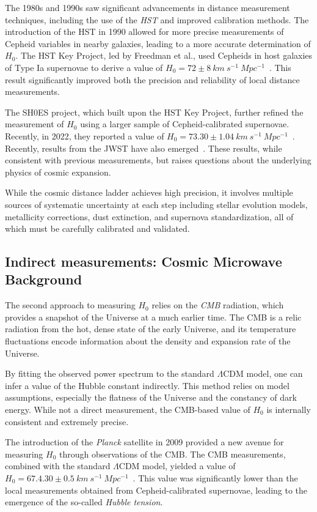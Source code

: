 The 1980s and 1990s saw significant advancements in distance measurement techniques, including the use of the \textit{\ac{HST}} and improved calibration methods. The introduction of the \ac{HST} in 1990 allowed for more precise measurements of Cepheid variables in nearby galaxies, leading to a more accurate determination of $H_0$. The \ac{HST} Key Project, led by Freedman et al., used Cepheids in host galaxies of Type Ia supernovae to derive a value of $H_0 = 72 \pm 8~km~s^{-1}~Mpc^{-1}$~\citep{freedman2001final}. This result significantly improved both the precision and reliability of local distance measurements.

The \ac{SH0ES} project, which built upon the \ac{HST} Key Project, further refined the measurement of $H_0$ using a larger sample of Cepheid-calibrated supernovae. Recently, in 2022, they reported a value of $H_0 = 73.30 \pm 1.04~km~s^{-1}~Mpc^{-1}$~\citep{riess2022comprehensive}. Recently, results from the \ac{JWST} have also emerged~\citep{freedman2024status}. These results, while consistent with previous measurements, but raises questions about the underlying physics of cosmic expansion.

While the cosmic distance ladder achieves high precision, it involves multiple sources of systematic uncertainty at each step including stellar evolution models, metallicity corrections, dust extinction, and supernova standardization, all of which must be carefully calibrated and validated.

\subsection{Indirect measurements: Cosmic Microwave Background}
The second approach to measuring $H_0$ relies on the \textit{\ac{CMB}} radiation, which provides a snapshot of the Universe at a much earlier time. The \ac{CMB} is a relic radiation from the hot, dense state of the early Universe, and its temperature fluctuations encode information about the density and expansion rate of the Universe.

By fitting the observed power spectrum to the standard $\Lambda$CDM model, one can infer a value of the Hubble constant indirectly. This method relies on model assumptions, especially the flatness of the Universe and the constancy of dark energy. While not a direct measurement, the \ac{CMB}-based value of $H_0$ is internally consistent and extremely precise.

The introduction of the \textit{Planck} satellite in 2009 provided a new avenue for measuring $H_0$ through observations of the \ac{CMB}. The \ac{CMB} measurements, combined with the standard $\Lambda$CDM model, yielded a value of $H_0 = 67.4.30 \pm 0.5~km~s^{-1}~Mpc^{-1}$~\citep{Planck:2018vyg}. This value was significantly lower than the local measurements obtained from Cepheid-calibrated supernovae, leading to the emergence of the so-called \textit{Hubble tension}.

